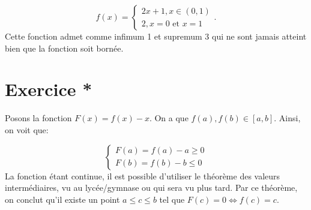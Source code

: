 \documentclass[a4paper, 12pt, french, twoside]{article}
\begin{document}
\begin{equation}
    f(x)=\begin{cases}
        2x+1, x\in (0,1)\\
        2, x=0 \text{ et } x=1
    \end{cases}.
\end{equation}
Cette fonction admet comme infimum 1 et supremum 3 qui ne sont jamais atteint bien que la fonction soit bornée.


\section{Exercice *}
Posons la fonction $F(x)=f(x)-x$. On a que $f(a), f(b)\in [a,b] $. Ainsi, on voit que:

\begin{equation}
    \begin{cases}
        F(a)= f(a)-a \geq 0\\
        F(b)= f(b)-b\leq 0
    \end{cases}
\end{equation}
La fonction étant continue, il est possible d'utiliser le théorème des valeurs intermédiaires, vu au lycée/gymnase ou qui sera vu plus tard. Par ce théorème, on conclut qu'il existe un point $a\leq c\leq b$ tel que $F(c)=0\iff f(c)=c$.
\end{document}
